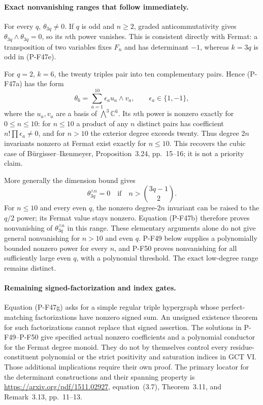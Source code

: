 \paragraph{Exact nonvanishing ranges that follow immediately.}
For every $q$, $\theta_{3q}\ne0$. If $q$ is odd and
$n\ge2$, graded anticommutativity gives
$\theta_{3q}\wedge\theta_{3q}=0$, so its $n$th power
vanishes. This is consistent directly with Fermat:
a transposition of two variables fixes $F_n$ and has
determinant $-1$, whereas $k=3q$ is odd in (P-F47e).

For $q=2$, $k=6$, the twenty triples pair into ten
complementary pairs. Hence (P-F47a) has the form
\[
          \theta_6=\sum_{a=1}^{10}\epsilon_a u_a\wedge v_a,
             \qquad \epsilon_a\in\{1,-1\},              \tag{P-F47h}
\]
where the $u_a,v_a$ are a basis of $\bigwedge^3\mathbb C^6$.
Its $n$th power is nonzero exactly for $0\le n\le10$:
for $n\le10$ a product of any $n$ distinct pairs has
coefficient $n!\prod\epsilon_a\ne0$, and for $n>10$
the exterior degree exceeds twenty. Thus degree $2n$
invariants nonzero at Fermat exist exactly for $n\le10$.
This recovers the cubic case of B\"urgisser--Ikenmeyer,
Proposition~3.24, pp.~15--16; it is not a priority claim.

More generally the dimension bound gives
\[
      \theta_{3q}^{\wedge n}=0
           \quad\text{if}\quad
                  n>\binom{3q-1}{2}.                   \tag{P-F47i}
\]
For $n\le10$ and every even $q$, the nonzero degree-$2n$
invariant can be raised to the $q/2$ power; its Fermat
value stays nonzero. Equation (P-F47b) therefore proves
nonvanishing of $\theta_{3q}^{\wedge n}$ in this range.
These elementary arguments alone do not give general
nonvanishing for $n>10$ and even $q$.
P-F49 below supplies a polynomially bounded nonzero
power for every $n$, and P-F50 proves nonvanishing
for all sufficiently large even $q$, with a polynomial
threshold. The exact low-degree range remains distinct.

\paragraph{Remaining signed-factorization and index gates.}
Equation (P-F47g) asks for a simple regular triple
hypergraph whose perfect-matching factorizations have
nonzero signed sum. An unsigned existence theorem for
such factorizations cannot replace that signed assertion.
The solutions in P-F49--P-F50 give specified actual
nonzero coefficients and a polynomial conductor for
the Fermat degree monoid. They do not
by themselves control every residue-constituent polynomial
or the strict positivity and saturation indices in
GCT VI. Those additional implications require their
own proof. The primary locator for the determinant
constructions and their spanning property is
\url{https://arxiv.org/pdf/1511.02927}, equation~(3.7),
Theorem~3.11, and Remark~3.13, pp.~11--13.
